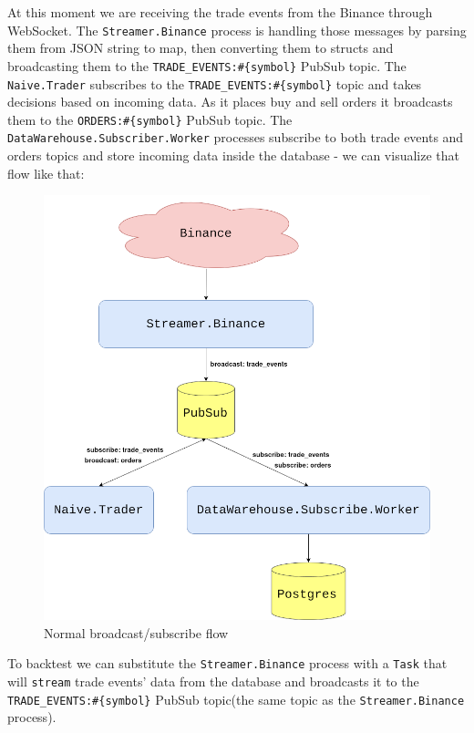 \documentclass[
  oneside]{book}
\begin{document}
At this moment we are receiving the trade events from the Binance through WebSocket. The \texttt{Streamer.Binance} process is handling those messages by parsing them from JSON string to map, then converting them to structs and broadcasting them to the \texttt{TRADE\_EVENTS:\#\{symbol\}} PubSub topic. The \texttt{Naive.Trader} subscribes to the \texttt{TRADE\_EVENTS:\#\{symbol\}} topic and takes decisions based on incoming data. As it places buy and sell orders it broadcasts them to the \texttt{ORDERS:\#\{symbol\}} PubSub topic. The \texttt{DataWarehouse.Subscriber.Worker} processes subscribe to both trade events and orders topics and store incoming data inside the database - we can visualize that flow like that:

\begin{figure}
\centering
\includegraphics{images/chapter_14_02_current_pubsub.png}
\caption{Normal broadcast/subscribe flow}
\end{figure}

To backtest we can substitute the \texttt{Streamer.Binance} process with a \texttt{Task} that will \texttt{stream} trade events' data from the database and broadcasts it to the \texttt{TRADE\_EVENTS:\#\{symbol\}} PubSub topic(the same topic as the \texttt{Streamer.Binance} process).
\end{document}
